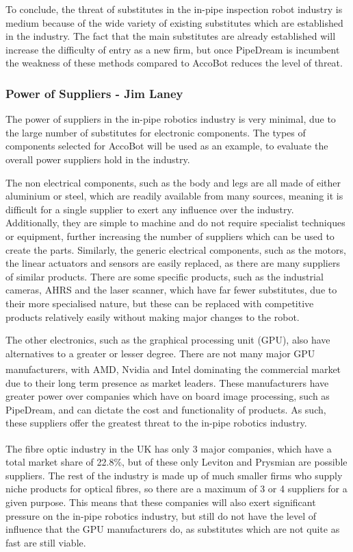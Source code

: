 \documentclass[11pt]{article}		%
\newcommand{\supercite}[1]{\textsuperscript{\cite{#1}}}		%
\begin{document}
				To conclude, the threat of substitutes in the in-pipe inspection robot industry is medium because of the wide variety of existing substitutes which are established in the industry.
				The fact that the main substitutes are already established will increase the difficulty of entry as a new firm, but once PipeDream is incumbent the weakness of these methods compared to AccoBot reduces the level of threat.
				
			\subsubsection{Power of Suppliers - Jim Laney}
				
				The power of suppliers in the in-pipe robotics industry is very minimal, due to the large number of substitutes for electronic components.
				The types of components selected for AccoBot will be used as an example, to evaluate the overall power suppliers hold in the industry.
				
				The non electrical components, such as the body and legs are all made of either aluminium or steel, which are readily available from many sources, meaning it is difficult for a single supplier to exert any influence over the industry.
				Additionally, they are simple to machine and do not require specialist techniques or equipment, further increasing the number of suppliers which can be used to create the parts.
				Similarly, the generic electrical components, such as the motors, the linear actuators and sensors are easily replaced, as there are many suppliers of similar products.
				There are some specific products, such as the industrial cameras, AHRS and the laser scanner, which have far fewer substitutes, due to their more specialised nature, but these can be replaced with competitive products relatively easily without making major changes to the robot.
				
				The other electronics, such as the graphical processing unit (GPU), also have alternatives to a greater or lesser degree.
				There are not many major GPU manufacturers, with AMD, Nvidia and Intel dominating the commercial market\supercite{rake2020graphic} due to their long term presence as market leaders.
				These manufacturers have greater power over companies which have on board image processing, such as PipeDream, and can dictate the cost and functionality of  products.
				As such, these suppliers offer the greatest threat to the in-pipe robotics industry.
				
				The fibre optic industry in the UK has only 3 major companies\supercite{neve2020fibreoptic}, which have a total market share of 22.8\%, but of these only Leviton and Prysmian are possible suppliers.
				The rest of the industry is made up of much smaller firms who supply niche products for optical fibres, so there are a maximum of 3 or 4 suppliers for a given purpose.
				This means that these companies will also exert significant pressure on the in-pipe robotics industry, but still do not have the level of influence that the GPU manufacturers do, as substitutes which are not quite as fast are still viable.
				
\end{document}
